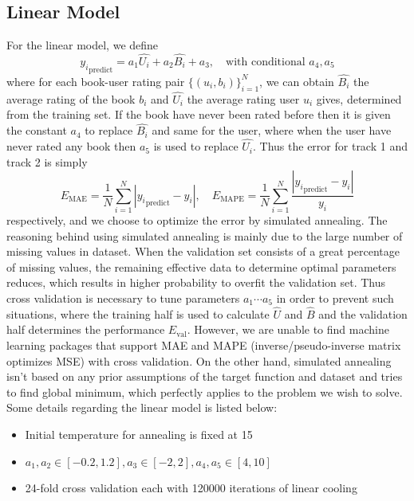 \documentclass{article}
\begin{document}
\subsection{Linear Model}
For the linear model, we define
$$
{y_i}_\text{predict} = a_1 \hat{U_i} + a_2 \hat{B_i} + a_3, \quad \text{with conditional } a_4, a_5
$$
where for each book-user rating pair $\{(u_i, b_i)\}_{i=1}^N$, we can obtain $\hat{B_i}$ the average rating of the book $b_i$ and $\hat{U_i}$ the average rating user $u_i$ gives, determined from the training set. If the book have never been rated before then it is given the constant $a_4$ to replace $\hat{B_i}$ and same for the user, where when the user have never rated any book then $a_5$ is used to replace $\hat{U_i}$. Thus the error for track 1 and track 2 is simply
$$
E_\text{MAE} = \frac{1}{N} \sum_{i=1}^N |{y_i}_\text{predict} - y_i|
, \quad
E_\text{MAPE} = \frac{1}{N} \sum_{i=1}^N \frac{|{y_i}_\text{predict} - y_i|}{y_i}
$$
respectively, and we choose to optimize the error by simulated annealing. The reasoning behind using simulated annealing is mainly due to the large number of missing values in dataset. When the validation set consists of a great percentage of missing values, the remaining effective data to determine optimal parameters reduces, which results in higher probability to overfit the validation set. Thus cross validation is necessary to tune parameters $a_1 \cdots a_5$ in order to prevent such situations, where the training half is used to calculate $\hat{U}$ and $\hat{B}$ and the validation half determines the performance $E_\text{val}$. However, we are unable to find machine learning packages that support MAE and MAPE (inverse/pseudo-inverse matrix optimizes MSE) with cross validation. On the other hand, simulated annealing isn't based on any prior assumptions of the target function and dataset and tries to find global minimum, which perfectly applies to the problem we wish to solve. Some details regarding the linear model is listed below:
\begin{itemize}
\item Initial temperature for annealing is fixed at 15\textdegree
\item $a_1, a_2 \in [-0.2, 1.2], a_3 \in [-2, 2], a_4, a_5 \in [4, 10]$
\item 24-fold cross validation each with 120000 iterations of linear cooling
\end{itemize}
\end{document}
